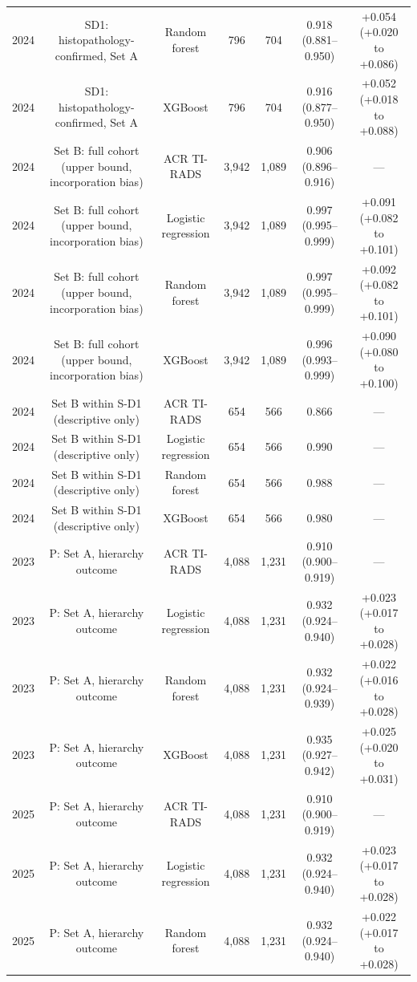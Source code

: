 \begin{table}[htbp]
{\begin{tabular}{@{}lcccccc@{}}
2024 & SD1: histopathology-confirmed, Set A & Random forest & 796 & 704 & 0.918 (0.881--0.950) & +0.054 (+0.020 to +0.086) \\
2024 & SD1: histopathology-confirmed, Set A & XGBoost & 796 & 704 & 0.916 (0.877--0.950) & +0.052 (+0.018 to +0.088) \\
2024 & Set B: full cohort (upper bound, incorporation bias) & ACR TI-RADS & 3,942 & 1,089 & 0.906 (0.896--0.916) & --- \\
2024 & Set B: full cohort (upper bound, incorporation bias) & Logistic regression & 3,942 & 1,089 & 0.997 (0.995--0.999) & +0.091 (+0.082 to +0.101) \\
2024 & Set B: full cohort (upper bound, incorporation bias) & Random forest & 3,942 & 1,089 & 0.997 (0.995--0.999) & +0.092 (+0.082 to +0.101) \\
2024 & Set B: full cohort (upper bound, incorporation bias) & XGBoost & 3,942 & 1,089 & 0.996 (0.993--0.999) & +0.090 (+0.080 to +0.100) \\
2024 & Set B within S-D1 (descriptive only) & ACR TI-RADS & 654 & 566 & 0.866 & --- \\
2024 & Set B within S-D1 (descriptive only) & Logistic regression & 654 & 566 & 0.990 & --- \\
2024 & Set B within S-D1 (descriptive only) & Random forest & 654 & 566 & 0.988 & --- \\
2024 & Set B within S-D1 (descriptive only) & XGBoost & 654 & 566 & 0.980 & --- \\
2023 & P: Set A, hierarchy outcome & ACR TI-RADS & 4,088 & 1,231 & 0.910 (0.900--0.919) & --- \\
2023 & P: Set A, hierarchy outcome & Logistic regression & 4,088 & 1,231 & 0.932 (0.924--0.940) & +0.023 (+0.017 to +0.028) \\
2023 & P: Set A, hierarchy outcome & Random forest & 4,088 & 1,231 & 0.932 (0.924--0.939) & +0.022 (+0.016 to +0.028) \\
2023 & P: Set A, hierarchy outcome & XGBoost & 4,088 & 1,231 & 0.935 (0.927--0.942) & +0.025 (+0.020 to +0.031) \\
2025 & P: Set A, hierarchy outcome & ACR TI-RADS & 4,088 & 1,231 & 0.910 (0.900--0.919) & --- \\
2025 & P: Set A, hierarchy outcome & Logistic regression & 4,088 & 1,231 & 0.932 (0.924--0.940) & +0.023 (+0.017 to +0.028) \\
2025 & P: Set A, hierarchy outcome & Random forest & 4,088 & 1,231 & 0.932 (0.924--0.940) & +0.022 (+0.017 to +0.028) \\

\end{tabular}}
\end{table}
